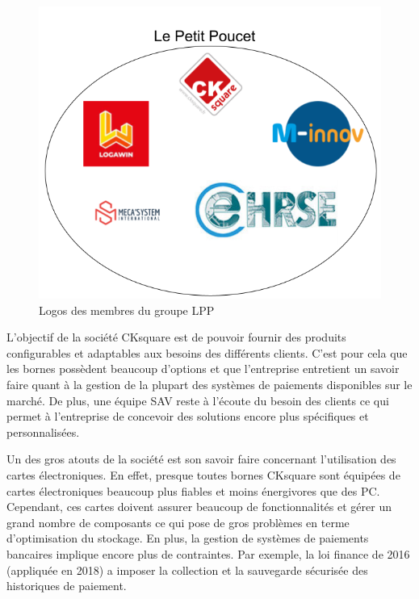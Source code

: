 \documentclass[a4paper]{article}
\begin{document}
\begin{figure}[h!]
  \begin{center}
  \includegraphics[scale=0.4]{./img/lpp-logos.png}
  \caption{Logos des membres du groupe LPP}
    \label{lpp-logos}
  \end{center}
\end{figure}

L'objectif de la société CKsquare est de pouvoir fournir des produits
configurables et adaptables aux besoins des différents clients. C'est pour cela
que les bornes possèdent beaucoup d'options et que l'entreprise entretient un
savoir faire quant à la gestion de la plupart des systèmes de paiements
disponibles sur le marché. De plus, une équipe SAV reste à l'écoute du besoin
des clients ce qui permet à l'entreprise de concevoir des solutions encore plus
spécifiques et personnalisées.

Un des gros atouts de la société est son savoir faire concernant l'utilisation
des cartes électroniques. En effet, presque toutes bornes CKsquare sont équipées
de cartes électroniques beaucoup plus fiables et moins énergivores que des PC.
Cependant, ces cartes doivent assurer beaucoup de fonctionnalités et gérer un
grand nombre de composants ce qui pose de gros problèmes en terme d'optimisation
du stockage. En plus, la gestion de systèmes de paiements bancaires implique
encore plus de contraintes. Par exemple, la loi finance de 2016 (appliquée en
2018) a imposer la collection et la sauvegarde sécurisée des historiques de
paiement.
\end{document}
